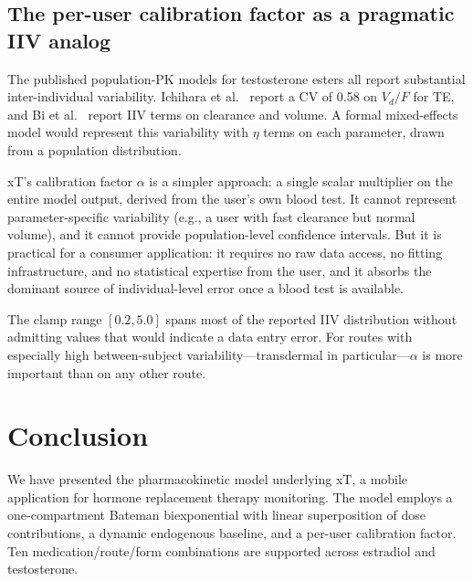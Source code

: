 \documentclass[11pt,a4paper]{article}
\begin{document}
\subsection{The per-user calibration factor as a pragmatic IIV analog}
\label{sec:iiv}

The published population-PK models for testosterone esters all report
substantial inter-individual variability. Ichihara et al.~\cite{ichihara2020}
report a CV of 0.58 on $V_d/F$ for TE, and Bi et al.~\cite{bi2018} report
IIV terms on clearance and volume. A formal mixed-effects model would
represent this variability with $\eta$ terms on each parameter, drawn
from a population distribution.

xT's calibration factor $\alpha$ is a simpler approach: a single scalar
multiplier on the entire model output, derived from the user's own blood
test. It cannot represent parameter-specific variability (e.g., a user
with fast clearance but normal volume), and it cannot provide
population-level confidence intervals. But it is practical for a
consumer application: it requires no raw data access, no fitting
infrastructure, and no statistical expertise from the user, and it
absorbs the dominant source of individual-level error once a blood test
is available.

The clamp range $[0.2, 5.0]$ spans most of the reported IIV distribution
without admitting values that would indicate a data entry error. For
routes with especially high between-subject variability---transdermal in
particular---$\alpha$ is more important than on any other route.

\section{Conclusion}
\label{sec:conclusion}

We have presented the pharmacokinetic model underlying xT, a mobile
application for hormone replacement therapy monitoring. The model
employs a one-compartment Bateman biexponential with linear
superposition of dose contributions, a dynamic endogenous baseline, and
a per-user calibration factor. Ten medication/route/form combinations
are supported across estradiol and testosterone.
\end{document}
